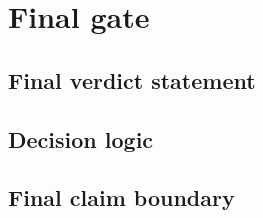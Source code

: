 \section{Final gate}\label{sec:final-gate}


\subsection{Final verdict statement}\label{subsec:final-verdict-statement}


\subsection{Decision logic}\label{subsec:decision-logic}


\subsection{Final claim boundary}\label{subsec:final-claim-boundary}

% 
